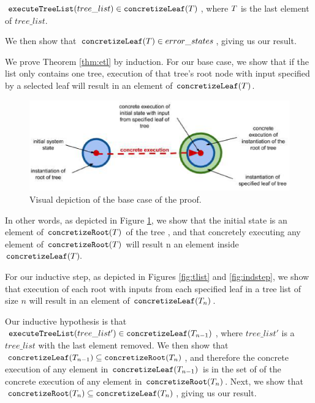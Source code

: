 \begin{theorem}
\label{thm:etl}
 $\mathtt{executeTreeList} (tree\_list) \in \mathtt{concretizeLeaf} (T)$, where $T$ is the last element of $tree\_list$.
\end{theorem}

We then show that $\mathtt{concretizeLeaf} (T) \in error\_states$, giving us our result.

We prove Theorem \ref{thm:etl} by induction. 
For our base case, we show that if the list only contains one tree, execution of that tree's root node with input specified by a selected leaf will result in an element of $\mathtt{concretizeLeaf}(T)$.

\begin{figure}
\centering
\includegraphics[width=.8\textwidth]{set3.eps}
\caption{Visual depiction of the base case of the proof.}
\label{fig:basecase}
\end{figure}

In other words, as depicted in Figure \ref{fig:basecase}, we show that the initial state is an element of $\mathtt{concretizeRoot}(T)$ of the tree \tree, and that concretely executing any element of $\mathtt{concretizeRoot}(T)$ will result n an element inside $\mathtt{concretizeLeaf}(T).$



For our inductive step, as depicted in Figures  \ref{fig:tlist} and \ref{fig:indstep}, we show that execution of each root with inputs from each specified leaf in a tree list of size $n$ will result in an element of $\mathtt{concretizeLeaf}(T_n)$.

Our inductive hypothesis is that $\mathtt{executeTreeList }(tree\_list') \in \mathtt{concretizeLeaf} (T_{n-1})$, where $tree\_list'$ is a $tree\_list$ with the last element removed. We then show that $\mathtt{concretizeLeaf} (T_{n-1}) \subseteq \mathtt{concretizeRoot} (T_{n}) $, and therefore the concrete execution of any element in $\mathtt{concretizeLeaf} (T_{n-1}) $ is in the set of of the concrete execution of any element in $\mathtt{concretizeRoot} (T_{n})$. Next, we show that $\mathtt{concretizeRoot} (T_{n}) \subseteq \mathtt{concretizeLeaf} (T_{n})$, giving us our result.
 
